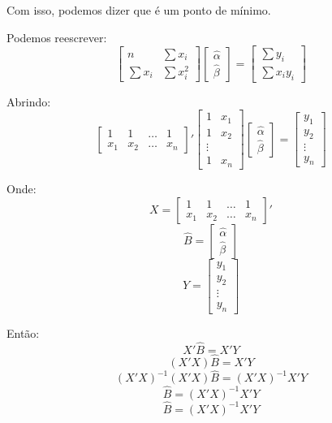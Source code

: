 \documentclass[
  letterpaper,
  DIV=11,
  numbers=noendperiod]{scrreprt}
\theoremstyle{definition}
\theoremstyle{plain}
\theoremstyle{remark}
\begin{document}
Com isso, podemos dizer que é um ponto de mínimo.

Podemos reescrever: \[
\begin{bmatrix}
n & \sum x_{i} \\
\sum x_{i} & \sum x_{i}^{2}
\end{bmatrix}
\begin{bmatrix}
\hat{\alpha} \\
\hat{\beta}
\end{bmatrix}
=
\begin{bmatrix}
\sum y_{i} \\
\sum x_{i} y_{i}
\end{bmatrix}
\]

Abrindo: \[
\begin{bmatrix}
1 & 1 & \dots & 1 \\
x_{1} & x_{2} & \dots & x_{n}
\end{bmatrix}'
\begin{bmatrix}
1 & x_{1} \\
1 & x_{2} \\
\vdots \\
1 & x_{n}
\end{bmatrix}
\begin{bmatrix}
\hat{\alpha} \\
\hat{\beta}
\end{bmatrix}
=
\begin{bmatrix}
y_{1} \\
y_{2} \\
\vdots \\
y_{n}
\end{bmatrix}
\]

Onde: \[
X =
\begin{bmatrix}
1 & 1 & \dots & 1 \\
x_{1} & x_{2} & \dots & x_{n}
\end{bmatrix}'
\] \[
\hat{B} =
\begin{bmatrix}
\hat{\alpha} \\
\hat{\beta}
\end{bmatrix}
\] \[
Y =
\begin{bmatrix}
y_{1} \\
y_{2} \\
\vdots \\
y_{n}
\end{bmatrix}
\]

Então: \[
X' \hat{B} = X' Y
\] \[
(X' X) \hat{B} = X' Y
\] \[
(X' X)^{-1} (X' X) \hat{B} = (X' X)^{-1} X' Y
\] \[
\hat{B} = (X' X)^{-1} X' Y
\] \[
\boxed{\hat{B} = (X' X)^{-1} X' Y}
\]
\end{document}

